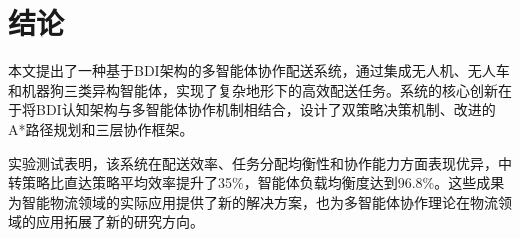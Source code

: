 \documentclass[12pt,a4paper]{article}
\begin{document}
\section{结论}

本文提出了一种基于BDI架构的多智能体协作配送系统，通过集成无人机、无人车和机器狗三类异构智能体，实现了复杂地形下的高效配送任务。系统的核心创新在于将BDI认知架构与多智能体协作机制相结合，设计了双策略决策机制、改进的A*路径规划和三层协作框架。

实验测试表明，该系统在配送效率、任务分配均衡性和协作能力方面表现优异，中转策略比直达策略平均效率提升了35\%，智能体负载均衡度达到96.8\%。这些成果为智能物流领域的实际应用提供了新的解决方案，也为多智能体协作理论在物流领域的应用拓展了新的研究方向。




\end{document}
